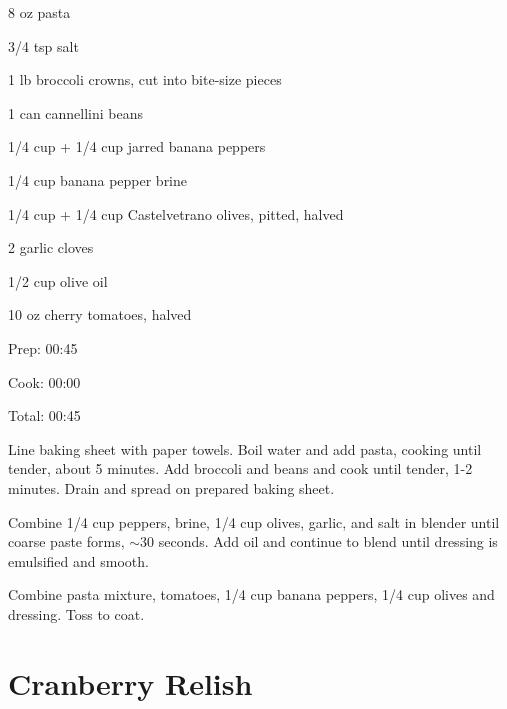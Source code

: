 \documentclass[oneside]{book}  %
\def\thisrecipe{}  %
\newcommand{\recipe}[1]{\section{#1}\def\thisrecipe{: #1}} %
\newcommand{\about}{$\sim$}
\begin{document}
\begin{IT}
  \begin{ingredients}
    \item[8 oz] pasta
    \item[3/4 tsp] salt
    \item[1 lb] broccoli crowns, cut into bite-size pieces
    \item[1 can] cannellini beans
    \item[1/4 cup + 1/4 cup] jarred banana peppers
    \item[1/4 cup] banana pepper brine
    \item[1/4 cup + 1/4 cup] Castelvetrano olives, pitted, halved
    \item[2] garlic cloves
    \item[1/2 cup] olive oil
    \item[10 oz] cherry tomatoes, halved
  \end{ingredients}

  \switchcolumn

  \begin{timeline}
    \item[Prep:]  00:45
    \item[Cook:]  00:00
    \item[Total:] 00:45
  \end{timeline}
\end{IT}

\begin{directions}
  \item Line baking sheet with paper towels. Boil water and add pasta, cooking
  until tender, about 5 minutes. Add broccoli and beans and cook until tender,
  1-2 minutes. Drain and spread on prepared baking sheet.

  \item Combine 1/4 cup peppers, brine, 1/4 cup olives, garlic, and salt in
  blender until coarse paste forms, \about 30 seconds. Add oil and continue to
  blend until dressing is emulsified and smooth.

  \item Combine pasta mixture, tomatoes, 1/4 cup banana peppers, 1/4 cup olives
  and dressing. Toss to coat.
\end{directions}
\recipe{Cranberry Relish} \label{recipe:cranberry_relish} %
\end{document}
